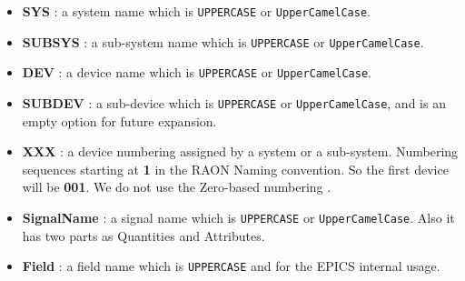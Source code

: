 \documentclass[11pt
  , a4paper
  , article
  , oneside
]{memoir}
\begin{document}
\begin{itemize}
\item \textbf{SYS}    : a system name which is \texttt{UPPERCASE} or \texttt{UpperCamelCase}. 
\item \textbf{SUBSYS} : a sub-system name which is \texttt{UPPERCASE} or \texttt{UpperCamelCase}. 
\item \textbf{DEV} : a device name which is \texttt{UPPERCASE} or \texttt{UpperCamelCase}.
\item \textbf{SUBDEV} : a sub-device which is \texttt{UPPERCASE} or \texttt{UpperCamelCase}, and is an empty option for future expansion.
\item \textbf{XXX}  : a device numbering assigned by a system or a sub-system. Numbering sequences starting at \textbf{1} in the RAON Naming convention. So the first device will be \textbf{001}. We do not use the Zero-based numbering \cite{ZERONUM}. 
\item \textbf{SignalName} : a signal name which is \texttt{UPPERCASE} or \texttt{UpperCamelCase}. Also it has two parts as Quantities and Attributes.
\item \textbf{Field} : a field name which is \texttt{UPPERCASE} and for the EPICS internal usage.
\end{itemize}

 

\end{document}
